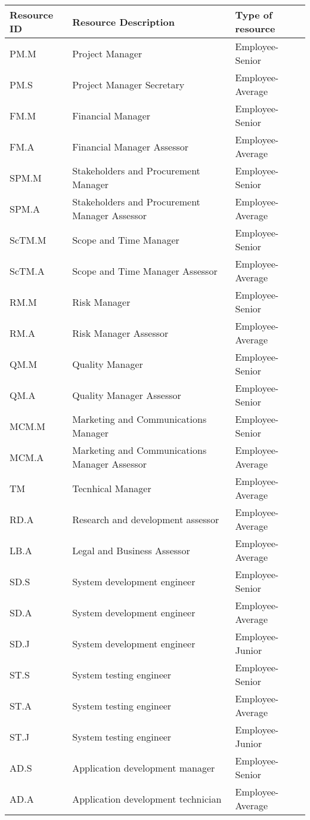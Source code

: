 \begin{longtable}{lll}
	
\toprule[2pt]

\textbf{Resource ID} & \textbf{Resource Description} & \textbf{Type of resource}  
	\\ \midrule[1.5pt] 
	\endhead
	
PM.M&Project Manager&Employee-Senior\\
PM.S&Project Manager Secretary&Employee-Average\\
FM.M&Financial Manager&Employee-Senior\\
FM.A&Financial Manager Assessor&Employee-Average\\
SPM.M&Stakeholders and Procurement Manager&Employee-Senior\\
SPM.A&Stakeholders and Procurement Manager Assessor&Employee-Average\\
ScTM.M&Scope and Time Manager&Employee-Senior\\
ScTM.A&Scope and Time Manager Assessor&Employee-Average\\
RM.M&Risk Manager&Employee-Senior\\
RM.A&Risk Manager Assessor&Employee-Average\\
QM.M&Quality Manager&Employee-Senior\\
QM.A&Quality Manager Assessor&Employee-Senior\\
MCM.M&Marketing and Communications Manager&Employee-Senior\\
MCM.A&Marketing and Communications Manager Assessor&Employee-Average\\
TM&Tecnhical Manager&Employee-Average\\
RD.A&Research and development assessor&Employee-Average\\
LB.A&Legal and Business Assessor&Employee-Average\\
SD.S&System development engineer&Employee-Senior\\
SD.A&System development engineer&Employee-Average\\
SD.J&System development engineer&Employee-Junior\\
ST.S&System testing engineer&Employee-Senior\\
ST.A&System testing engineer&Employee-Average\\
ST.J&System testing engineer&Employee-Junior\\
AD.S&Application development manager&Employee-Senior\\
AD.A&Application development technician&Employee-Average\\

\end{longtable}
